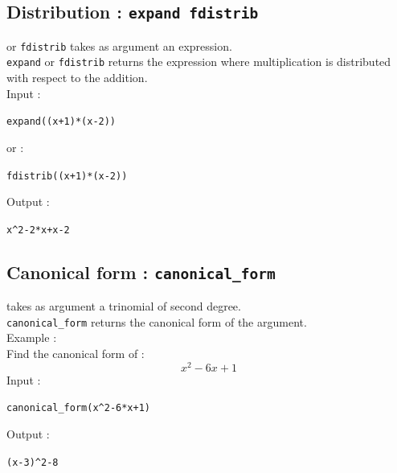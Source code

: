 \documentclass[a4paper,11pt]{book}
\begin{document}
\subsection{Distribution : {\tt expand fdistrib}}
 or {\tt fdistrib} takes as argument an expression.\\
{\tt expand} or {\tt fdistrib} returns the expression where
multiplication is distributed with respect to the addition.\\ 
Input :
\begin{center}{\tt expand((x+1)*(x-2))}\end{center}
or :
\begin{center}{\tt fdistrib((x+1)*(x-2))}\end{center}
Output :
\begin{center}{\tt x\verb|^|2-2*x+x-2}\end{center} 

\subsection{Canonical form : {\tt canonical\_form}}
 takes as argument a trinomial of second 
degree.\\ 
{\tt canonical\_form} returns the canonical form of the argument.\\
Example :\\
Find the canonical form of :
$$x^2-6x+1$$
Input :
\begin{center}{\tt canonical\_form(x\verb|^|2-6*x+1)}\end{center}
Output :
\begin{center}{\tt (x-3)\verb|^|2-8}\end{center}
\end{document}
